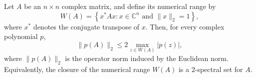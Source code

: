 \documentclass{article}
\begin{document}
Let \(A\) be an \(n \times n\) complex matrix, and define its numerical range by
\[
W(A)
=
\left\{
x^{*} A x :
x \in \mathbb{C}^{n}
\text{ and }
\|x\|_{2}=1
\right\},
\]
where \(x^{*}\) denotes the conjugate transpose of \(x\). Then, for every complex polynomial \(p\),
\[
\|p(A)\|_{2}
\leq
2 \max_{z \in W(A)} |p(z)|,
\]
where \(\|p(A)\|_{2}\) is the operator norm induced by the Euclidean norm. Equivalently, the closure of the numerical range \(W(A)\) is a \(2\)-spectral set for \(A\).
\end{document}
